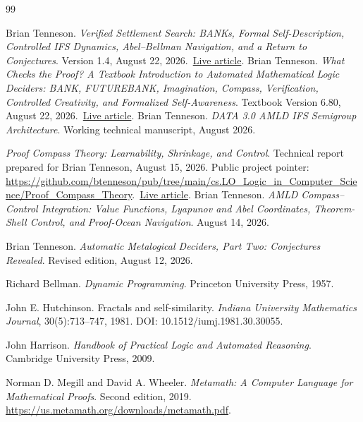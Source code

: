 \documentclass[11pt,letterpaper]{article}
\theoremstyle{remark}
\begin{document}
\begin{thebibliography}{99}

Brian Tenneson.
\newblock \emph{Verified Settlement Search: BANKs, Formal Self-Description, Controlled IFS Dynamics, Abel--Bellman Navigation, and a Return to Conjectures}.
\newblock Version 1.4, August 22, 2026.\ \href{https://btenneson.github.io/pub/papers/verified_settlement_search_v1_4/}{Live article}.
Brian Tenneson.
\newblock \emph{What Checks the Proof? A Textbook Introduction to Automated Mathematical Logic Deciders: BANK, FUTUREBANK, Imagination, Compass, Verification, Controlled Creativity, and Formalized Self-Awareness}.
\newblock Textbook Version 6.80, August 22, 2026.\ \href{https://btenneson.github.io/pub/papers/what_checks_the_proof_v6_80/}{Live article}.
Brian Tenneson.
\newblock \emph{DATA 3.0 AMLD IFS Semigroup Architecture}.
\newblock Working technical manuscript, August 2026.

\newblock \emph{Proof Compass Theory: Learnability, Shrinkage, and Control}.
\newblock Technical report prepared for Brian Tenneson, August 15, 2026.
\newblock Public project pointer: \url{https://github.com/btenneson/pub/tree/main/cs.LO_Logic_in_Computer_Science/Proof_Compass_Theory}.\ \href{https://btenneson.github.io/pub/papers/proof_compass_theory/}{Live article}.
Brian Tenneson.
\newblock \emph{AMLD Compass--Control Integration: Value Functions, Lyapunov and Abel Coordinates, Theorem-Shell Control, and Proof-Ocean Navigation}.
\newblock August 14, 2026.

Brian Tenneson.
\newblock \emph{Automatic Metalogical Deciders, Part Two: Conjectures Revealed}.
\newblock Revised edition, August 12, 2026.

Richard Bellman.
\newblock \emph{Dynamic Programming}.
\newblock Princeton University Press, 1957.

John E. Hutchinson.
\newblock Fractals and self-similarity.
\newblock \emph{Indiana University Mathematics Journal}, 30(5):713--747, 1981.
\newblock DOI: 10.1512/iumj.1981.30.30055.

John Harrison.
\newblock \emph{Handbook of Practical Logic and Automated Reasoning}.
\newblock Cambridge University Press, 2009.

Norman D. Megill and David A. Wheeler.
\newblock \emph{Metamath: A Computer Language for Mathematical Proofs}.
\newblock Second edition, 2019.
\newblock \url{https://us.metamath.org/downloads/metamath.pdf}.

\end{thebibliography}
\end{document}

